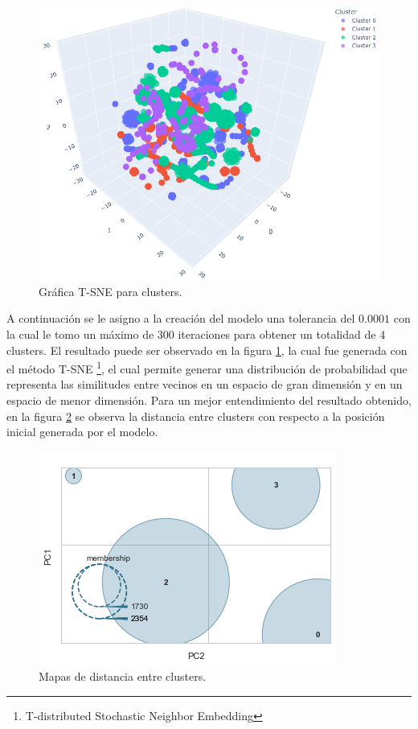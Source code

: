 \begin{figure}[h!]
	\centering
	\includegraphics[width=1
	\linewidth]{IMAGENES/Tsne}
	\caption{Gráfica T-SNE para clusters.}
	\label{TSNE}
\end{figure} 

A continuación se le asigno a la creación del modelo una tolerancia del $0.0001$ con la cual le tomo un máximo de 300 iteraciones para obtener un totalidad de 4 clusters. El resultado puede ser observado en la figura \ref{TSNE}, la cual fue generada con el método T-SNE \footnote{T-distributed Stochastic Neighbor Embedding}, el cual permite generar una distribución de probabilidad que representa las similitudes entre vecinos en un espacio de gran dimensión y en un espacio de menor dimensión. Para un mejor entendimiento del resultado obtenido, en la figura \ref{Distance} se observa la distancia entre clusters con respecto a la posición inicial generada por el modelo.

\begin{figure}[h!]
	\centering
	\includegraphics[width=1
	\linewidth]{IMAGENES/Distance}
	\caption{Mapas de distancia entre clusters.}
	\label{Distance}
\end{figure} 

